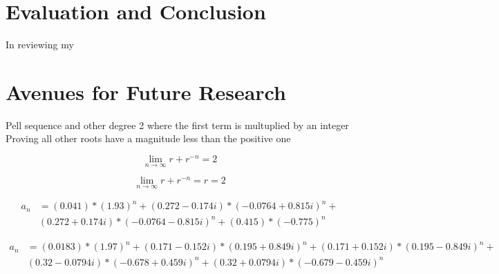 \documentclass[11pt]{article}
\begin{document}
\section{Evaluation and Conclusion}
In reviewing my 

\section{Avenues for Future Research}
Pell sequence and other degree 2 where the first term is multuplied by an integer 
Proving all other roots have a magnitude less than the positive one

\newpage 

\[\lim_{n\to\infty}r+r^{-n}=2\]

\[\lim_{n\to\infty}r+r^{-n}=r=2\]

\begin{align*}
    a_n &= (0.041)*(1.93)^n + (0.272 - 0.174i)*(-0.0764 + 0.815i)^n + \\ &(0.272 + 0.174i)*(-0.0764 - 0.815i)^n + (0.415)*(-0.775)^n
\end{align*}

\begin{align*}
    a_n &= (0.0183)*(1.97)^n + (0.171 - 0.152i)*(0.195 + 0.849i)^n + (0.171 + 0.152i)*(0.195 - 0.849i)^n + \\ &(0.32 - 0.0794i)*(-0.678 + 0.459i)^n + (0.32 + 0.0794i)*(-0.679 - 0.459i)^n
\end{align*}
\end{document}
